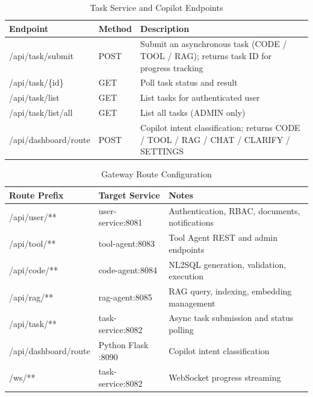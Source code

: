 
\begin{table}[H]
\small\singlespacing
\centering
\caption{Task Service and Copilot Endpoints}
\label{tab:api-task}
\begin{tabularx}{\textwidth}{>{\RaggedRight\arraybackslash}p{}>{\RaggedRight\arraybackslash}p{1.3cm}>{\RaggedRight\arraybackslash}X}
\toprule
\textbf{Endpoint} & \textbf{Method} & \textbf{Description} \\
\midrule
/api/task/submit & POST & Submit an asynchronous task (CODE / TOOL / RAG); returns task ID for progress tracking \\
/api/task/\{id\} & GET & Poll task status and result \\
/api/task/list & GET & List tasks for authenticated user \\
/api/task/list/all & GET & List all tasks (ADMIN only) \\
/api/dashboard/route & POST & Copilot intent classification; returns CODE / TOOL / RAG / CHAT / CLARIFY / SETTINGS \\
\bottomrule
\end{tabularx}
\end{table}


\begin{table}[H]
\small\singlespacing
\centering
\caption{Gateway Route Configuration}
\label{tab:api-gateway}
\begin{tabularx}{\textwidth}{>{\RaggedRight\arraybackslash}p{}>{\RaggedRight\arraybackslash}p{}>{\RaggedRight\arraybackslash}X}
\toprule
\textbf{Route Prefix} & \textbf{Target Service} & \textbf{Notes} \\
\midrule
/api/user/** & user-service:8081 & Authentication, RBAC, documents, notifications \\
/api/tool/** & tool-agent:8083 & Tool Agent REST and admin endpoints \\
/api/code/** & code-agent:8084 & NL2SQL generation, validation, execution \\
/api/rag/** & rag-agent:8085 & RAG query, indexing, embedding management \\
/api/task/** & task-service:8082 & Async task submission and status polling \\
/api/dashboard/route & Python Flask :8090 & Copilot intent classification \\
/ws/** & task-service:8082 & WebSocket progress streaming \\
\bottomrule
\end{tabularx}
\end{table}

\newpage

